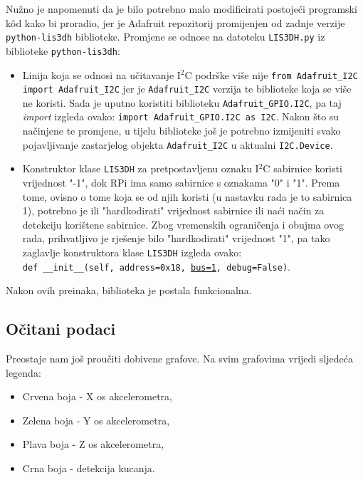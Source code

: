 \documentclass[12pt,a4paper]{article}
\begin{document}
		



	Nužno je napomenuti da je bilo potrebno malo modificirati postojeći programski kôd kako bi proradio, jer je Adafruit repozitorij promijenjen od zadnje verzije \texttt{python-lis3dh} biblioteke. Promjene se odnose na datoteku \texttt{LIS3DH.py} iz biblioteke \texttt{python-lis3dh}:
		\begin{itemize}
			\item Linija koja se odnosi na učitavanje I$^2$C podrške više nije 
			\texttt{from Adafruit\_I2C import Adafruit\_I2C} jer je \texttt{Adafruit\_I2C} verzija te biblioteke koja se više ne koristi. Sada je uputno koristiti biblioteku \texttt{Adafruit\_GPIO.I2C}, pa taj \textit{import} izgleda ovako:
			\texttt{import Adafruit\_GPIO.I2C as I2C}. 
			Nakon što su načinjene te promjene, u tijelu biblioteke još je potrebno izmijeniti svako pojavljivanje zastarjelog objekta \texttt{Adafruit\_I2C} u aktualni \texttt{I2C.Device}.
			\item Konstruktor klase \texttt{LIS3DH} za pretpostavljenu oznaku I$^2$C sabirnice koristi vrijednost "-1", dok RPi ima samo sabirnice s oznakama "0" i "1". Prema tome, ovisno o tome koja se od njih koristi (u nastavku rada je to sabirnica 1), potrebno je ili "hardkodirati" vrijednost sabirnice ili naći način za detekciju korištene sabirnice. Zbog vremenskih ograničenja i obujma ovog rada, prihvatljivo je rješenje bilo "hardkodirati" vrijednost "1", pa tako zaglavlje konstruktora klase \texttt{LIS3DH} izgleda ovako: \\ 
			\texttt{def \_\_init\_\_(self, address=0x18, \underline{bus=1}, debug=False)}.
		\end{itemize}
		Nakon ovih preinaka, biblioteka je postala funkcionalna.

	\newpage
	\subsection{Očitani podaci}
	Preostaje nam još proučiti dobivene grafove. Na svim grafovima vrijedi sljedeća legenda:
	\begin{itemize}
		\item Crvena boja - X os akcelerometra,
		\item Zelena boja - Y os akcelerometra,
		\item Plava boja - Z os akcelerometra,
		\item Crna boja - detekcija kucanja.
	\end{itemize}
\end{document}
